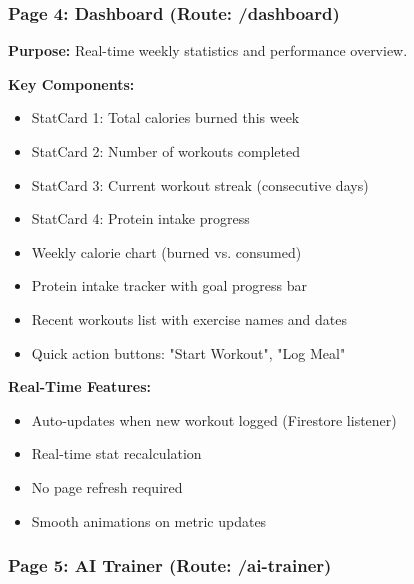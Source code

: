 \documentclass[12pt,a4paper]{article}
\begin{document}
\subsubsection*{Page 4: Dashboard (Route: /dashboard)}

\textbf{Purpose:} Real-time weekly statistics and performance overview.

\textbf{Key Components:}
\begin{itemize}[noitemsep, topsep=2pt]
  \item StatCard 1: Total calories burned this week
  \item StatCard 2: Number of workouts completed
  \item StatCard 3: Current workout streak (consecutive days)
  \item StatCard 4: Protein intake progress
  \item Weekly calorie chart (burned vs. consumed)
  \item Protein intake tracker with goal progress bar
  \item Recent workouts list with exercise names and dates
  \item Quick action buttons: "Start Workout", "Log Meal"
\end{itemize}

\textbf{Real-Time Features:}
\begin{itemize}[noitemsep, topsep=2pt]
  \item Auto-updates when new workout logged (Firestore listener)
  \item Real-time stat recalculation
  \item No page refresh required
  \item Smooth animations on metric updates
\end{itemize}

\vspace{0.5cm}
\noindent{}
\vspace{1cm}


\subsubsection*{Page 5: AI Trainer (Route: /ai-trainer)}
\end{document}
